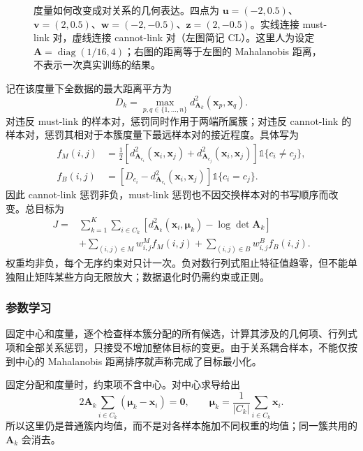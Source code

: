 \begin{figure}[htbp]
 \centering
 
 \caption{度量如何改变成对关系的几何表达。四点为 $\bm{u}=(-2,0.5)$、$\bm{v}=(2,0.5)$、$\bm{w}=(-2,-0.5)$、$\bm{z}=(2,-0.5)$。实线连接 must-link 对，虚线连接 cannot-link 对（左图简记 CL）。这里人为设定 $\bm{A}=\operatorname{diag}(1/16,4)$；右图的距离等于左图的 Mahalanobis 距离，不表示一次真实训练的结果。}
 \label{fig:clustering-metric-constraints}
\end{figure}

记在该度量下全数据的最大距离平方为
\[
 D_k=\max_{p,q\in\{1,\ldots,n\}}
 d_{\bm{A}_k}^2(\bm{x}_p,\bm{x}_q).
\]
对违反 must-link 的样本对，惩罚同时作用于两端所属簇；对违反 cannot-link 的样本对，惩罚其相对于本簇度量下最远样本对的接近程度。具体写为
\begin{align}
 f_M(i,j)
 &=\frac12\left[
 d_{\bm{A}_{c_i}}^2(\bm{x}_i,\bm{x}_j)
 +d_{\bm{A}_{c_j}}^2(\bm{x}_i,\bm{x}_j)\right]
 \mathbb{1}\{c_i\ne c_j\},\nonumber\\
 f_B(i,j)
 &=\left[D_{c_i}
 -d_{\bm{A}_{c_i}}^2(\bm{x}_i,\bm{x}_j)\right]
 \mathbb{1}\{c_i=c_j\}.
 \label{eq:clustering-mpck-penalty}
\end{align}
因此 cannot-link 惩罚非负，must-link 惩罚也不因交换样本对的书写顺序而改变。总目标为
\begin{equation}
 \begin{aligned}
 J={}&\sum_{k=1}^K\sum_{i\in C_k}
 \left[d_{\bm{A}_k}^2(\bm{x}_i,\bm{\mu}_k)
       -\log\det\bm{A}_k\right]\\
 &+\sum_{(i,j)\in M}w_{i,j}^{M}f_M(i,j)
  +\sum_{(i,j)\in B}w_{i,j}^{B}f_B(i,j).
 \end{aligned}
 \label{eq:clustering-mpck}
\end{equation}
权重均非负，每个无序约束对只计一次。负对数行列式阻止特征值趋零，但不能单独阻止矩阵某些方向无限放大；数据退化时仍需约束或正则。

\subsubsection{参数学习}

固定中心和度量，逐个检查样本簇分配的所有候选，计算其涉及的几何项、行列式项和全部关系惩罚，只接受不增加整体目标的变更。由于关系耦合样本，不能仅按到中心的 Mahalanobis 距离排序就声称完成了目标最小化。

固定分配和度量时，约束项不含中心。对中心求导给出
\[
 2\bm{A}_k\sum_{i\in C_k}(\bm{\mu}_k-\bm{x}_i)=\bm{0},
 \qquad
 \bm{\mu}_k=\frac{1}{|C_k|}\sum_{i\in C_k}\bm{x}_i.
\]
所以这里仍是普通簇内均值，而不是对各样本施加不同权重的均值；同一簇共用的 $\bm{A}_k$ 会消去。

